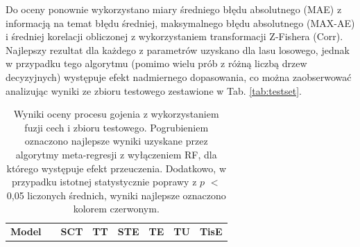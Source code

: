 Do oceny ponownie wykorzystano miary średniego błędu absolutnego (MAE) z informacją na temat błędu średniej, maksymalnego błędu absolutnego (MAX-AE) i średniej korelacji obliczonej z wykorzystaniem transformacji Z-Fishera (Corr). Najlepszy rezultat dla każdego z parametrów uzyskano dla lasu losowego, jednak w przypadku tego algorytmu (pomimo wielu prób z różną liczbą drzew decyzyjnych) występuje efekt nadmiernego dopasowania, co można zaobserwować analizując wyniki ze zbioru testowego zestawione \linebreak w Tab. \ref{tab:testset}. 

\begin{table}[]
	\caption{Wyniki oceny procesu gojenia z wykorzystaniem fuzji cech i zbioru testowego. Pogrubieniem oznaczono najlepsze wyniki uzyskane przez algorytmy meta-regresji z wyłączeniem RF, dla którego występuje efekt przeuczenia. Dodatkowo, w przypadku istotnej statystycznie poprawy z $p$ $<$ 0,05 liczonych średnich, wyniki najlepsze oznaczono kolorem czerwonym.}
	\scriptsize
	\begin{center}
		\begin{tabular}{lc||c|c|c|c|c|c}
			\textbf{Model} & & \textbf{SCT} & \textbf{TT} & \textbf{STE} & \textbf{TE} & \textbf{TU} & \textbf{TisE}\\ 
			

\end{tabular}
\end{center}
\end{table}
